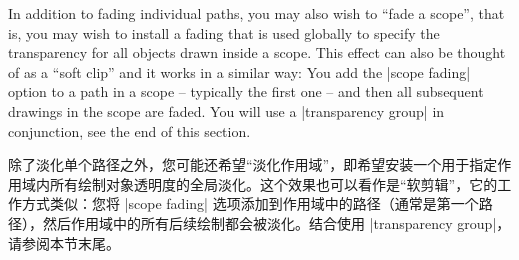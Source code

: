 In addition to fading individual paths, you may also wish to ``fade a scope'',
that is, you may wish to install a fading that is used globally to specify the
transparency for all objects drawn inside a scope. This effect can also be
thought of as a ``soft clip'' and it works in a similar way: You add the
|scope fading| option to a path in a scope -- typically the first one -- and
then all subsequent drawings in the scope are faded. You will use a
|transparency group| in conjunction, see the end of this section.

除了淡化单个路径之外，您可能还希望“淡化作用域”，即希望安装一个用于指定作用域内所有绘制对象透明度的全局淡化。这个效果也可以看作是“软剪辑”，它的工作方式类似：您将 |scope fading| 选项添加到作用域中的路径（通常是第一个路径），然后作用域中的所有后续绘制都会被淡化。结合使用 |transparency group|，请参阅本节末尾。

